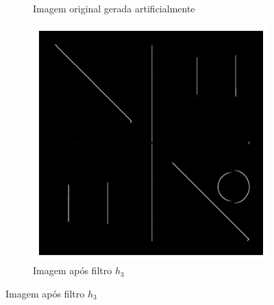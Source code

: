 \documentclass[12pt,a4paper]{report}
\begin{document}
\begin{enumerate}
\begin{figure}[H]
\begin{subfigure}{0.8\textwidth}
      \caption{Imagem original gerada artificialmente}
      \label{fig:imagem_gerada_artificialmente}
      \end{subfigure}
      \begin{subfigure}{0.8\textwidth}
        \includegraphics[width=\linewidth]{imagens/ex10-03.png}
        \caption{Imagem após filtro $h_3$}
        \label{fig:realce_bordas_verticais}
      \end{subfigure}
    \end{figure}
  

\end{enumerate}
\end{document}
